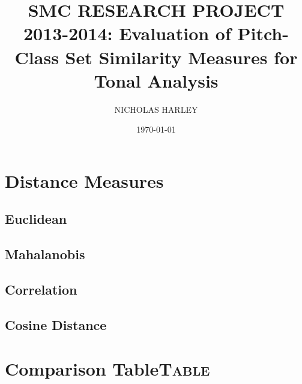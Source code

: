 \documentclass[11pt]{article}
\author{NICHOLAS HARLEY}
\date{\today}
\title{SMC RESEARCH PROJECT 2013-2014: Evaluation of Pitch-Class Set Similarity Measures for Tonal Analysis}
\begin{document}
\maketitle
\tableofcontents


\section{Distance Measures}
\label{sec-1}
\subsection{Euclidean}
\label{sec-1-1}
\subsection{Mahalanobis}
\label{sec-1-2}
\subsection{Correlation}
\label{sec-1-3}
\subsection{Cosine Distance}
\label{sec-1-4}

\section{Comparison Table\hfill{}\textsc{Table}}
\label{sec-2}
\end{document}
